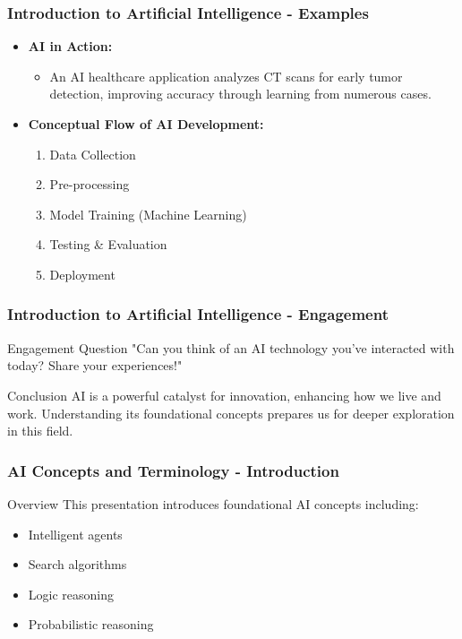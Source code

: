 \documentclass[aspectratio=169]{beamer}
\begin{document}
\begin{frame}[fragile]
    \frametitle{Introduction to Artificial Intelligence - Examples}
    \begin{itemize}
        \item \textbf{AI in Action:}
            \begin{itemize}
                \item An AI healthcare application analyzes CT scans for early tumor detection, improving accuracy through learning from numerous cases.
            \end{itemize}
        \item \textbf{Conceptual Flow of AI Development:}
            \begin{enumerate}
                \item Data Collection
                \item Pre-processing
                \item Model Training (Machine Learning)
                \item Testing \& Evaluation
                \item Deployment
            \end{enumerate}
    \end{itemize}
\end{frame}

\begin{frame}[fragile]
    \frametitle{Introduction to Artificial Intelligence - Engagement}
    \begin{block}{Engagement Question}
        "Can you think of an AI technology you've interacted with today? Share your experiences!"
    \end{block}
    \begin{block}{Conclusion}
        AI is a powerful catalyst for innovation, enhancing how we live and work. Understanding its foundational concepts prepares us for deeper exploration in this field.
    \end{block}
\end{frame}

\begin{frame}[fragile]
    \frametitle{AI Concepts and Terminology - Introduction}
    \begin{block}{Overview}
        This presentation introduces foundational AI concepts including:
        \begin{itemize}
            \item Intelligent agents
            \item Search algorithms
            \item Logic reasoning
            \item Probabilistic reasoning
        \end{itemize}
    \end{block}
\end{frame}
\end{document}
